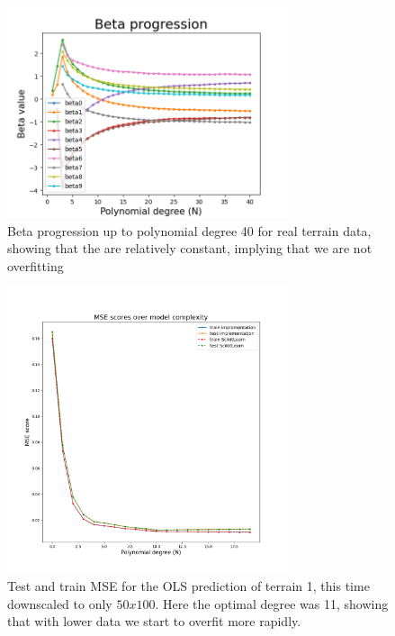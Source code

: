 \documentclass[twocolumn,10pt,cleanfoot]{asme2ej}
\begin{document}
\begin{figure}
\centerline{\includegraphics[width=3.25in]{figure/realOLSbetaprog40.png}}
\caption{Beta progression up to polynomial degree 40 for real terrain data, showing that the are relatively constant, implying that we are not overfitting}
\label{realOLSbetaprog40}
\end{figure}

\begin{figure}
\centerline{\includegraphics[width=3.25in]{figure/real1mselessdata.png}}
\caption{Test and train MSE for the OLS prediction of terrain 1, this time downscaled to only $50x100$. Here the optimal degree was 11, showing that with lower data we start to overfit more rapidly.}
\label{real1mselessdata}
\end{figure}
\end{document}
